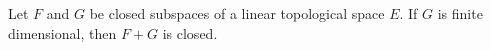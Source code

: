 Let $F$ and $G$ be closed subspaces of a linear topological space $E$. If $G$ is finite dimensional, then $F + G$ is closed.

